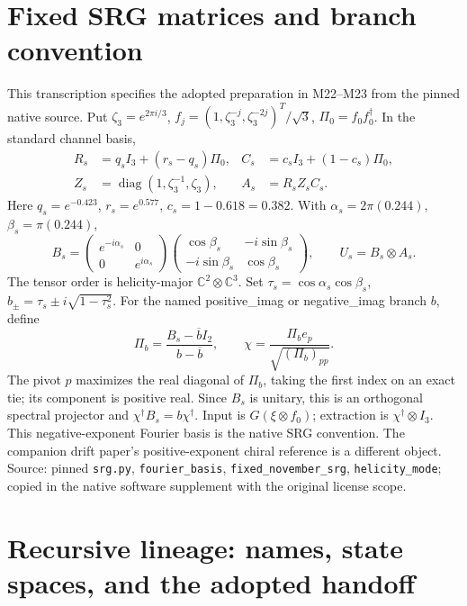 \documentclass[11pt,a4paper]{article}
\begin{document}
\section{Fixed SRG matrices and branch convention}
This transcription specifies the adopted preparation in M22--M23 from the pinned native source. Put \(\zeta_3=e^{2\pi i/3}\), \(f_j=(1,\zeta_3^{-j},\zeta_3^{-2j})^T/\sqrt3\), \(\Pi_0=f_0f_0^\dagger\). In the standard channel basis,
\[
\begin{aligned}
R_s&=q_s I_3+(r_s-q_s)\Pi_0,& C_s&=c_s I_3+(1-c_s)\Pi_0,\\
Z_s&=\operatorname{diag}(1,\zeta_3^{-1},\zeta_3),& A_s&=R_sZ_sC_s .
\end{aligned}
\]
Here \(q_s=e^{-0.423}\), \(r_s=e^{0.577}\), \(c_s=1-0.618=0.382\). With \(\alpha_s=2\pi(0.244)\), \(\beta_s=\pi(0.244)\),
\[
B_s=\begin{pmatrix}e^{-i\alpha_s}&0\\0&e^{i\alpha_s}\end{pmatrix}
\begin{pmatrix}\cos\beta_s&-i\sin\beta_s\\-i\sin\beta_s&\cos\beta_s\end{pmatrix},
\qquad U_s=B_s\otimes A_s .
\]
The tensor order is helicity-major \(\mathbb C^2\otimes\mathbb C^3\).
Set \(\tau_s=\cos\alpha_s\cos\beta_s\), \(b_\pm=\tau_s\pm i\sqrt{1-\tau_s^2}\).
For the named positive\_imag or negative\_imag branch \(b\), define
\[
\Pi_b=\frac{B_s-\overline b I_2}{b-\overline b},\qquad
\chi=\frac{\Pi_b e_p}{\sqrt{(\Pi_b)_{pp}}}.
\]
The pivot \(p\) maximizes the real diagonal of \(\Pi_b\), taking the first index on an exact tie; its component is positive real. Since \(B_s\) is unitary, this is an orthogonal spectral projector and \(\chi^\dagger B_s=b\chi^\dagger\). Input is \(G(\xi\otimes f_0)\); extraction is \(\chi^\dagger\otimes I_3\).
This negative-exponent Fourier basis is the native SRG convention. The companion drift paper's positive-exponent chiral reference is a different object.
Source: pinned \texttt{srg.py}, \texttt{fourier\_basis}, \texttt{fixed\_november\_srg}, \texttt{helicity\_mode}; copied in the native software supplement with the original license scope.

\clearpage
\section{Recursive lineage: names, state spaces, and the adopted handoff}
\label{app:lineage}
\end{document}
